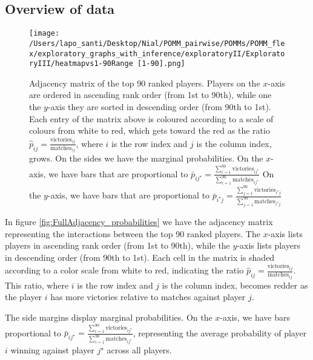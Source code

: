 \documentclass[11pt]{amsart}
\begin{document}
\subsection{Overview of data}

\begin{figure}
\begin{center}
\texttt{[image: /Users/lapo\_santi/Desktop/Nial/POMM\_pairwise/POMMs/POMM\_flex/exploratory\_graphs\_with\_inference/exploratoryII/ExploratoryIII/heatmapvs1-90Range [1-90].png]}
\caption{Adjacency matrix of the top 90 ranked players. Players on the $x$-axis are ordered in ascending rank order (from 1st to 90th), while one the $y$-axis they are sorted in descending order (from 90th to 1st). Each entry of the matrix above is coloured according to a scale of colours from white to red, which gets toward the red as the ratio $\hat{p}_{ij}= \frac{\text{victories}_{ij}}{\text{matches}_{ij}}$, where $i$ is the row index and $j$ is the column index, grows. 
On the sides we have the marginal probabilities. On the $x$-axis, we have bars that are proportional to $\bar{p}_{ij^\star}=\frac{\sum_{i=1}^{90}  \text{victories}_{ij^\star}}{\sum_{i=1}^{90}\text{matches}_{i j^\star}}$
On the $y$-axis, we have bars that are proportional to $\bar{p}_{i^\star j}=\frac{\sum_{j=1}^{90}  \text{victories}_{i^\star j}}{\sum_{j=1}^{90}\text{matches}_{i^\star j}}$}
\label{fig:FullAdjacency_probabilities}
\end{center}
\end{figure}

In figure \eqref{fig:FullAdjacency_probabilities} we have the adjacency matrix representing the interactions between the top 90 ranked players. The $x$-axis lists players in ascending rank order (from 1st to 90th), while the $y$-axis lists players in descending order (from 90th to 1st). Each cell in the matrix is shaded according to a color scale from white to red, indicating the ratio $\hat{p}_{ij} = \frac{\text{victories}_{ij}}{\text{matches}_{ij}}$. This ratio, where $i$ is the row index and $j$ is the column index, becomes redder as the player $i$ has more victories relative to matches against player $j$.

The side margins display marginal probabilities. On the $x$-axis, we have bars proportional to $\bar{p}_{ij^\star} = \frac{\sum_{i=1}^{90} \text{victories}_{ij^\star}}{\sum_{i=1}^{90}\text{matches}_{ij^\star}}$, representing the average probability of player $i$ winning against player $j^\star$ across all players. 
\end{document}
